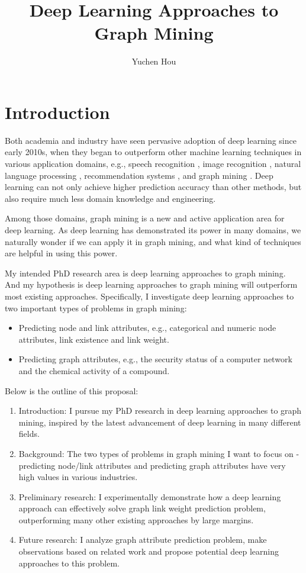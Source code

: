 \documentclass{article}
\begin{document}
	\title{Deep Learning Approaches to Graph Mining}
	\author{Yuchen Hou}
	\maketitle

\section{Introduction}
Both academia and industry have seen pervasive adoption of deep learning since early 2010s,
when they began to outperform other machine learning techniques in various 
application domains, e.g.,
speech recognition \cite{hannun2014deep},
image recognition \cite{simonyan2014very},
natural language processing \cite{yao2013recurrent},
recommendation systems \cite{barkan2016item2vec},
and graph mining \cite{grovernode2vec}.
Deep learning can not only achieve higher prediction accuracy than other methods,
but also require much less domain knowledge and engineering.

Among those domains,
graph mining is a new and active application area for deep learning.
As deep learning has demonstrated its power in many domains,
we naturally wonder if we can apply it in graph mining,
and what kind of techniques are helpful in using this power.

My intended PhD research area is deep learning approaches to graph mining.
And my hypothesis is deep learning approaches to graph mining
will outperform most existing approaches.
Specifically, I investigate deep learning approaches to
two important types of problems in graph mining:
\begin{itemize}
	\item Predicting node and link attributes, e.g., categorical and numeric node attributes, link existence and link weight.
	\item Predicting graph attributes, e.g., the security status of a computer network and the chemical activity of a compound.
\end{itemize}
Below is the outline of this proposal:
\begin{enumerate}
	\item Introduction: I pursue my PhD research in deep learning approaches to
	 graph mining, inspired by the latest advancement of deep learning
	 in many different fields.
	\item Background: The two types of problems in graph mining I want to focus on - predicting node/link attributes and predicting graph attributes
	have very high values in various industries.
	\item Preliminary research: I experimentally demonstrate how a deep learning
	approach can effectively solve graph link weight prediction problem,
	outperforming many other existing approaches by large margins.
	\item Future research: I analyze graph attribute prediction problem, make observations based on related work and propose potential deep learning approaches to this problem.
\end{enumerate}
\end{document}
